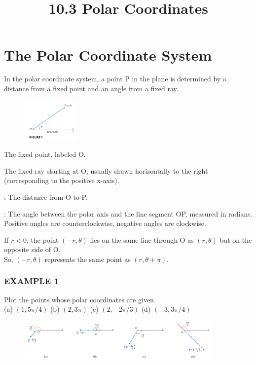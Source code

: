 \documentclass{article}
\title{10.3 Polar Coordinates}
\date{}
\author{}
\begin{document}
\maketitle
\section*{The Polar Coordinate System}
In the polar coordinate system, a point P in the plane is determined by a distance from a fixed point and an angle from a fixed ray.

\begin{description}
    \begin{figure}[htbp]
        \centering
        \includegraphics[width=0.25\textwidth]{graph29.png}
    \end{figure}
    \item[Pole (or Origin):] The fixed point, labeled O.
    \item[Polar Axis:] The fixed ray starting at O, usually drawn horizontally to the right (corresponding to the positive x-axis).
    \item[Polar Coordinates $(r, \theta)$:]
            \item [$r$]: The distance from O to P.
            \item [$\theta$]: The angle between the polar axis and the line segment OP, measured in radians.\\ Positive angles are counterclockwise, negative angles are clockwise.
\end{description}

If $r<0$, the point $(-r, \theta)$ lies on the same line through O as $(r, \theta)$ but on the opposite side of O. \\
So, $(-r, \theta)$ represents the same point as $(r, \theta + \pi)$.

\subsubsection*{EXAMPLE 1}
Plot the points whose polar coordinates are given.
\\ (a) $(1, 5\pi/4)$  (b) $(2, 3\pi)$  (c) $(2, -2\pi/3)$  (d) $(-3, 3\pi/4)$
\begin{figure}[htbp]
    \centering
    \includegraphics[width=0.9\textwidth]{graph30.png}
\end{figure}
\end{document}
